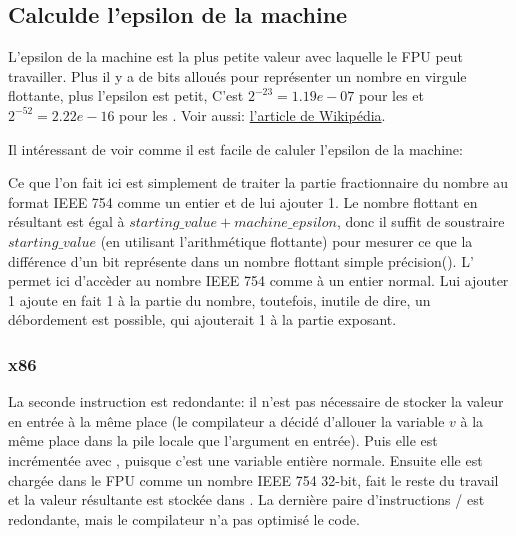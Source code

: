﻿\subsection{Calculde l'epsilon de la machine}

L'epsilon de la machine est la plus petite valeur avec laquelle le \ac{FPU} peut
travailler.
Plus il y a de bits alloués pour représenter un nombre en virgule flottante, plus
l'epsilon est petit,
C'est $2^{-23} = 1.19e-07$ pour les \Tfloat et $2^{-52} = 2.22e-16$ pour les \Tdouble.
Voir aussi: \href{http://link.yurichev.com/17367}{l'article de Wikipédia}.%

Il intéressant de voir comme il est facile de caluler l'epsilon de la machine:



Ce que l'on fait ici est simplement de traiter la partie fractionnaire du nombre
au format IEEE 754 comme un entier et de lui ajouter 1.
Le nombre flottant en résultant est égal à $starting\_value+machine\_epsilon$, donc
il suffit de soustraire $starting\_value$ (en utilisant l'arithmétique flottante)
pour mesurer ce que la différence d'un bit représente dans un nombre flottant simple
précision(\Tfloat).
L'  permet ici d'accèder au nombre IEEE 754 comme à un entier normal.
Lui ajouter 1 ajoute en fait 1 à la partie  du nombre, toutefois,
inutile de dire, un débordement est possible, qui ajouterait 1 à la partie exposant.

\subsubsection{x86}



La seconde instruction  est redondante: il n'est pas nécessaire de stocker
la valeur en entrée à la même place (le compilateur a décidé d'allouer la variable
$v$ à la même place dans la pile locale que l'argument en entrée).
Puis elle est incrémentée avec , puisque c'est une variable entière normale.
Ensuite elle est chargée dans le FPU comme un nombre IEEE 754 32-bit, 
fait le reste du travail et la valeur résultante est stockée dans .
La dernière paire d'instructions / est redondante, mais le compilateur
n'a pas optimisé le code.

